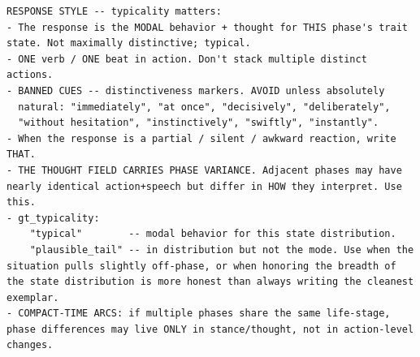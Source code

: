 \documentclass{llmxive}
\begin{document}
\begin{table}[htbp]
\begin{lstlisting}[basicstyle=\ttfamily\scriptsize]
RESPONSE STYLE -- typicality matters:
- The response is the MODAL behavior + thought for THIS phase's trait state. Not maximally distinctive; typical.
- ONE verb / ONE beat in action. Don't stack multiple distinct actions.
- BANNED CUES -- distinctiveness markers. AVOID unless absolutely
  natural: "immediately", "at once", "decisively", "deliberately",
  "without hesitation", "instinctively", "swiftly", "instantly".
- When the response is a partial / silent / awkward reaction, write THAT.
- THE THOUGHT FIELD CARRIES PHASE VARIANCE. Adjacent phases may have nearly identical action+speech but differ in HOW they interpret. Use this.
- gt_typicality:
    "typical"        -- modal behavior for this state distribution.
    "plausible_tail" -- in distribution but not the mode. Use when the situation pulls slightly off-phase, or when honoring the breadth of the state distribution is more honest than always writing the cleanest exemplar.
- COMPACT-TIME ARCS: if multiple phases share the same life-stage, phase differences may live ONLY in stance/thought, not in action-level changes.
\end{lstlisting}
\caption{Shared style guideline (\texttt{\_style\_block}). Inlined verbatim into the user message of the three probe designers (Tables~\ref{tab:prompt-in-text-designer}--\ref{tab:prompt-oow-designer}).}
\label{tab:prompt-style}
\end{table}
\end{document}
